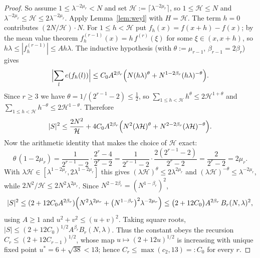 \documentclass[11pt]{article}
\theoremstyle{definition}
\theoremstyle{plain}
\begin{document}
\begin{proof}
So assume $1\le\lambda^{-2\mu_{r}}<N$ and set
$\mathcal H:=\lceil\lambda^{-2\mu_{r}}\rceil$, so $1\le\mathcal H\le N$ and
$\lambda^{-2\mu_{r}}\le\mathcal H\le2\lambda^{-2\mu_{r}}$.  Apply
Lemma~\ref{lem:weyl} with $H=\mathcal H$.  The term $h=0$ contributes
$(2N/\mathcal H)\cdot N$.  For $1\le h<\mathcal H$ put
$f_{h}(x)=f(x+h)-f(x)$; by the mean value theorem
$f_{h}^{(r-1)}(x)=h\,f^{(r)}(\xi)$ for some $\xi\in(x,x+h)$, so
$h\lambda\le|f_{h}^{(r-1)}|\le Ah\lambda$.  The inductive hypothesis
(with $\theta:=\mu_{r-1}$, $\beta_{r-1}=2\beta_{r}$) gives
\[
\Bigl|\sum_{l}e(f_{h}(l))\Bigr|
\le C_{0}A^{2\beta_{r}}\Bigl(N(h\lambda)^{\theta}
+N^{1-2\beta_{r}}(h\lambda)^{-\theta}\Bigr).
\]
Since $r\ge3$ we have $\theta=1/(2^{r-1}-2)\le\tfrac12$, so
$\sum_{1\le h<\mathcal H}h^{\theta}\le2\mathcal H^{1+\theta}$ and
$\sum_{1\le h<\mathcal H}h^{-\theta}\le2\mathcal H^{1-\theta}$.  Therefore
\[
|S|^{2}\le\frac{2N^{2}}{\mathcal H}
+4C_{0}A^{2\beta_{r}}\Bigl(N^{2}(\lambda\mathcal H)^{\theta}
+N^{2-2\beta_{r}}(\lambda\mathcal H)^{-\theta}\Bigr).
\]
Now the arithmetic identity that makes the choice of $\mathcal H$ exact:
\[
\theta\,(1-2\mu_{r})
=\frac{1}{2^{r-1}-2}\cdot\frac{2^{r}-4}{2^{r}-2}
=\frac{1}{2^{r-1}-2}\cdot\frac{2(2^{r-1}-2)}{2^{r}-2}
=\frac{2}{2^{r}-2}=2\mu_{r}.
\]
With $\lambda\mathcal H\in[\lambda^{1-2\mu_{r}},2\lambda^{1-2\mu_{r}}]$
this gives $(\lambda\mathcal H)^{\theta}\le2\lambda^{2\mu_{r}}$ and
$(\lambda\mathcal H)^{-\theta}\le\lambda^{-2\mu_{r}}$, while
$2N^{2}/\mathcal H\le2N^{2}\lambda^{2\mu_{r}}$.  Since
$N^{2-2\beta_{r}}=(N^{1-\beta_{r}})^{2}$,
\[
|S|^{2}\le(2+12C_{0}A^{2\beta_{r}})
\Bigl(N^{2}\lambda^{2\mu_{r}}+\bigl(N^{1-\beta_{r}}\bigr)^{2}
\lambda^{-2\mu_{r}}\Bigr)
\le\bigl(2+12C_{0}\bigr)A^{2\beta_{r}}\,B_{r}(N,\lambda)^{2},
\]
using $A\ge1$ and $u^{2}+v^{2}\le(u+v)^{2}$.  Taking square roots,
$|S|\le(2+12C_{0})^{1/2}A^{\beta_{r}}B_{r}(N,\lambda)$.  Thus the
constant obeys the recursion $C_{r}\le(2+12C_{r-1})^{1/2}$, whose map
$u\mapsto(2+12u)^{1/2}$ is increasing with unique fixed point
$u^{*}=6+\sqrt{38}<13$; hence $C_{r}\le\max(c_{2},13)=:C_{0}$ for every
$r$.
\end{proof}
\end{document}
